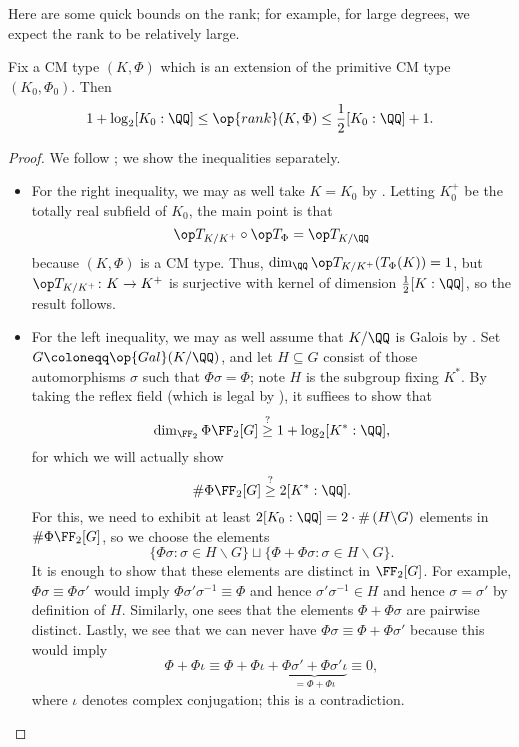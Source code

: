 \documentclass{article}
\begin{document}
Here are some quick bounds on the rank; for example, for large degrees, we expect the rank to be relatively large.
\begin{proposition} \label{prop:cm-rank-bound}
	Fix a CM type $(K,\Phi)$ which is an extension of the primitive CM type $(K_0,\Phi_0)$. Then
	\[1+\log_2[K_0:\QQ]\le\op{rank}(K,\Phi)\le\frac12[K_0:\QQ]+1.\]
\end{proposition}
\begin{proof}
	We follow \cite[Theorem~1.2]{lang-cm}; we show the inequalities separately.
	\begin{itemize}
		\item For the right inequality, we may as well take $K=K_0$ by . Letting $K_0^+$ be the totally real subfield of $K_0$, the main point is that
		\[{\op T_{K/K^+}}\circ{\op T_\Phi}=\op T_{K/\QQ}\]
		because $(K,\Phi)$ is a CM type. Thus, $\dim_\QQ\op T_{K/K^+}(T_\Phi(K))=1$, but $\op T_{K/K^+}\colon K\to K^+$ is surjective with kernel of dimension $\frac12[K:\QQ]$, so the result follows. 
		\item For the left inequality, we may as well assume that $K/\QQ$ is Galois by . Set $G\coloneqq\op{Gal}(K/\QQ)$, and let $H\subseteq G$ consist of those automorphisms $\sigma$ such that $\Phi\sigma=\Phi$; note $H$ is the subgroup fixing $K^*$. By taking the reflex field (which is legal by ), it suffiees to show that
		\[\dim_{\FF_2}\Phi\FF_2[G]\stackrel?\ge1+\log_2[K^*:\QQ],\]
		for which we will actually show
		\[\#\Phi\FF_2[G]\stackrel?\ge2[K^*:\QQ].\]
		For this, we need to exhibit at least $2[K_0:\QQ]=2\cdot\#\left(H\backslash G\right)$ elements in $\#\Phi\FF_2[G]$, so we choose the elements
		\[\{\Phi\sigma:\sigma\in H\backslash G\}\sqcup\{\Phi+\Phi\sigma:\sigma\in H\backslash G\}.\]
		It is enough to show that these elements are distinct in $\FF_2[G]$. For example, $\Phi\sigma\equiv\Phi\sigma'$ would imply $\Phi\sigma'\sigma^{-1}\equiv\Phi$ and hence $\sigma'\sigma^{-1}\in H$ and hence $\sigma=\sigma'$ by definition of $H$. Similarly, one sees that the elements $\Phi+\Phi\sigma$ are pairwise distinct. Lastly, we see that we can never have $\Phi\sigma\equiv\Phi+\Phi\sigma'$ because this would imply
		\[\Phi+\Phi\iota\equiv\Phi+\Phi\iota+\underbrace{\Phi\sigma'+\Phi\sigma'\iota}_{=\Phi+\Phi\iota}\equiv0,\]
		where $\iota$ denotes complex conjugation; this is a contradiction.
		\qedhere
	\end{itemize}
\end{proof}
\end{document}
